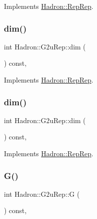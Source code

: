 Implements \mbox{\hyperlink{structHadron_1_1RepRep_a92c8802e5ed7afd7da43ccfd5b7cd92b}{Hadron\+::\+Rep\+Rep}}.

\mbox{\label{structHadron_1_1G2uRep_a1cfbf4340498e3300f5d921ed683dea8}} 
\subsubsection{\texorpdfstring{dim()}{dim()}\hspace{0.1cm}{\footnotesize\ttfamily [4/5]}}
{\footnotesize\ttfamily int Hadron\+::\+G2u\+Rep\+::dim (\begin{DoxyParamCaption}{ }\end{DoxyParamCaption}) const\hspace{0.3cm}{\ttfamily [inline]}, {\ttfamily [virtual]}}



Implements \mbox{\hyperlink{structHadron_1_1RepRep_a92c8802e5ed7afd7da43ccfd5b7cd92b}{Hadron\+::\+Rep\+Rep}}.

\mbox{\label{structHadron_1_1G2uRep_a1cfbf4340498e3300f5d921ed683dea8}} 
\subsubsection{\texorpdfstring{dim()}{dim()}\hspace{0.1cm}{\footnotesize\ttfamily [5/5]}}
{\footnotesize\ttfamily int Hadron\+::\+G2u\+Rep\+::dim (\begin{DoxyParamCaption}{ }\end{DoxyParamCaption}) const\hspace{0.3cm}{\ttfamily [inline]}, {\ttfamily [virtual]}}



Implements \mbox{\hyperlink{structHadron_1_1RepRep_a92c8802e5ed7afd7da43ccfd5b7cd92b}{Hadron\+::\+Rep\+Rep}}.

\mbox{\label{structHadron_1_1G2uRep_ada683c14614d17ba8a131f1b32a1777d}} 
\subsubsection{\texorpdfstring{G()}{G()}\hspace{0.1cm}{\footnotesize\ttfamily [1/3]}}
{\footnotesize\ttfamily int Hadron\+::\+G2u\+Rep\+::G (\begin{DoxyParamCaption}{ }\end{DoxyParamCaption}) const\hspace{0.3cm}{\ttfamily [inline]}, {\ttfamily [virtual]}}

